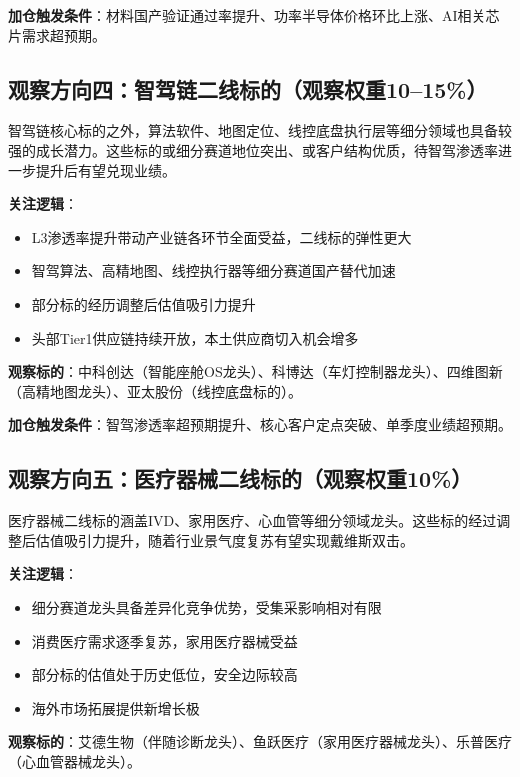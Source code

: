 \textbf{加仓触发条件}：材料国产验证通过率提升、功率半导体价格环比上涨、AI相关芯片需求超预期。

\subsection{观察方向四：智驾链二线标的（观察权重10--15\%）}

智驾链核心标的之外，算法软件、地图定位、线控底盘执行层等细分领域也具备较强的成长潜力。这些标的或细分赛道地位突出、或客户结构优质，待智驾渗透率进一步提升后有望兑现业绩。

\textbf{关注逻辑}：
\vspace{0.2em}
\begin{itemize}[leftmargin=2em]
\item L3渗透率提升带动产业链各环节全面受益，二线标的弹性更大
\item 智驾算法、高精地图、线控执行器等细分赛道国产替代加速
\item 部分标的经历调整后估值吸引力提升
\item 头部Tier1供应链持续开放，本土供应商切入机会增多
\end{itemize}

\textbf{观察标的}：中科创达（智能座舱OS龙头）、科博达（车灯控制器龙头）、四维图新（高精地图龙头）、亚太股份（线控底盘标的）。

\textbf{加仓触发条件}：智驾渗透率超预期提升、核心客户定点突破、单季度业绩超预期。

\subsection{观察方向五：医疗器械二线标的（观察权重10\%）}

医疗器械二线标的涵盖IVD、家用医疗、心血管等细分领域龙头。这些标的经过调整后估值吸引力提升，随着行业景气度复苏有望实现戴维斯双击。

\textbf{关注逻辑}：
\vspace{0.2em}
\begin{itemize}[leftmargin=2em]
\item 细分赛道龙头具备差异化竞争优势，受集采影响相对有限
\item 消费医疗需求逐季复苏，家用医疗器械受益
\item 部分标的估值处于历史低位，安全边际较高
\item 海外市场拓展提供新增长极
\end{itemize}

\textbf{观察标的}：艾德生物（伴随诊断龙头）、鱼跃医疗（家用医疗器械龙头）、乐普医疗（心血管器械龙头）。


